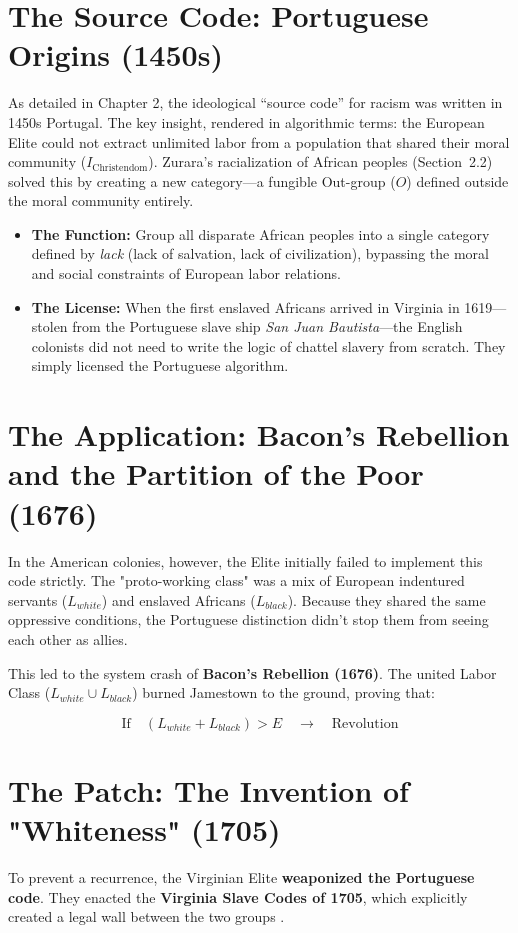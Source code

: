 \documentclass[12pt,openany]{book}
\begin{document}
\section{The Source Code: Portuguese Origins (1450s)}
As detailed in Chapter 2, the ideological ``source code'' for racism was written in 1450s Portugal. The key insight, rendered in algorithmic terms: the European Elite could not extract unlimited labor from a population that shared their moral community ($I_{\text{Christendom}}$). Zurara's racialization of African peoples (Section~2.2) solved this by creating a new category---a fungible Out-group ($O$) defined outside the moral community entirely.

\begin{itemize}
    \item \textbf{The Function:} Group all disparate African peoples into a single category defined by \textit{lack} (lack of salvation, lack of civilization), bypassing the moral and social constraints of European labor relations.
    \item \textbf{The License:} When the first enslaved Africans arrived in Virginia in 1619---stolen from the Portuguese slave ship \textit{San Juan Bautista}---the English colonists did not need to write the logic of chattel slavery from scratch. They simply licensed the Portuguese algorithm.
\end{itemize}

\section{The Application: Bacon's Rebellion and the Partition of the Poor (1676)}
In the American colonies, however, the Elite initially failed to implement this code strictly. The "proto-working class" was a mix of European indentured servants ($L_{white}$) and enslaved Africans ($L_{black}$). Because they shared the same oppressive conditions, the Portuguese distinction didn't stop them from seeing each other as allies.

This led to the system crash of \textbf{Bacon's Rebellion (1676)}. The united Labor Class ($L_{white} \cup L_{black}$) burned Jamestown to the ground, proving that:

\[
\text{If} \quad (L_{white} + L_{black}) > E \quad \rightarrow \quad \text{Revolution}
\]

\section{The Patch: The Invention of "Whiteness" (1705)}
To prevent a recurrence, the Virginian Elite \textbf{weaponized the Portuguese code}. They enacted the \textbf{Virginia Slave Codes of 1705}, which explicitly created a legal wall between the two groups \cite{allen, kendi}.
\end{document}
